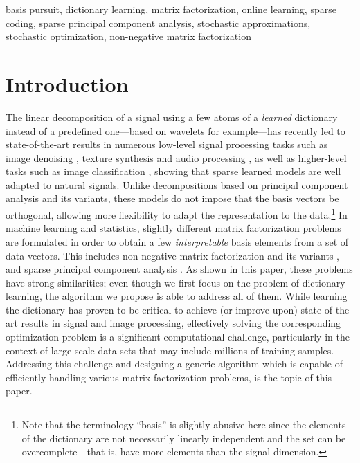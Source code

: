 \documentclass[twoside,11pt]{article}
\begin{document}
 \begin{keywords}
basis pursuit, dictionary learning, matrix factorization, online
learning, sparse coding, sparse principal component analysis,
stochastic approximations, stochastic optimization,
 non-negative matrix factorization
 \end{keywords}

\section{Introduction}
The linear decomposition of a signal using a few atoms of a \emph{learned}
dictionary instead of a predefined one---based on wavelets \citep{mallat} for
example---has recently led to state-of-the-art results in numerous low-level
signal processing tasks such as image denoising \citep{elad,mairal}, texture
synthesis \citep{peyre} and audio processing \citep{grosse,fevotte,zibulevsky}, as well as
higher-level tasks such as image classification \citep{raina,mairal3,mairal6,bradley,yang},
showing that sparse learned models are well adapted to natural signals.
Unlike decompositions based on principal component analysis and its variants,
these models do not impose that the basis vectors be orthogonal, allowing
more flexibility to adapt the representation to the data.\footnote{Note that
the terminology ``basis'' is slightly abusive here since the elements of the
dictionary are not necessarily linearly independent and the set can be overcomplete---that is, have more elements than the signal dimension.} In machine learning and
statistics, slightly different matrix factorization problems are formulated 
in order to obtain a few \emph{interpretable} basis elements from a set of data
vectors. This includes non-negative matrix factorization and its variants
\citep{lee2,hoyer,hoyer2,lin}, and sparse principal component analysis
\citep{zou2,aspremont,bach2,witten,zass}. As
shown in this paper, these problems have strong similarities; even though we
first focus on the problem of dictionary learning, the algorithm we propose
is able to address all of them.  While learning the dictionary has proven to
be critical to achieve (or improve upon) state-of-the-art results in signal
and image processing, effectively solving the corresponding optimization
problem is a significant computational challenge, particularly in the context
of large-scale data sets that may include millions of training samples.
Addressing this challenge and designing a generic algorithm which is 
capable of efficiently handling various matrix factorization problems,
is the topic of this paper. 
\end{document}
